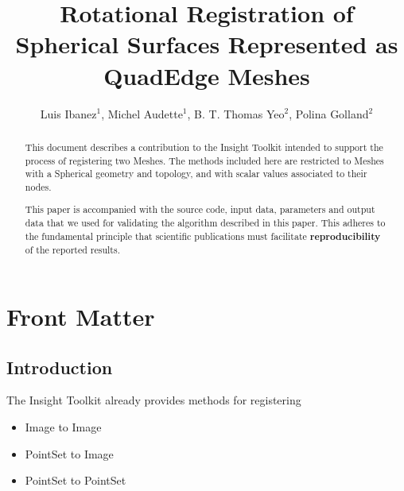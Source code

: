 \documentclass{InsightArticle}
\title{Rotational Registration of Spherical Surfaces Represented as QuadEdge Meshes}
\author{Luis Ibanez$^{1}$, Michel Audette$^{1}$, B. T. Thomas Yeo$^{2}$, Polina Golland$^{2}$}
\newcommand{\IJhandlerIDnumber}{3063}
\begin{document}
%
% 
\IJhandlefooter{\IJhandlerIDnumber}


\ifpdf
\else
\fi


\maketitle


\ifhtml
\chapter*{Front Matter\label{front}}
\fi


\begin{abstract}
\noindent
This document describes a contribution to the Insight Toolkit intended to
support the process of registering two Meshes.  The methods included here are
restricted to Meshes with a Spherical geometry and topology, and with scalar
values associated to their nodes.

This paper is accompanied with the source code, input data, parameters and
output data that we used for validating the algorithm described in this paper.
This adheres to the fundamental principle that scientific publications must
facilitate \textbf{reproducibility} of the reported results.
\end{abstract}

\tableofcontents

\section{Introduction}

The Insight Toolkit already provides methods for registering

\begin{itemize}
\item Image to Image
\item PointSet to Image
\item PointSet to PointSet
\end{itemize}
\end{document}

